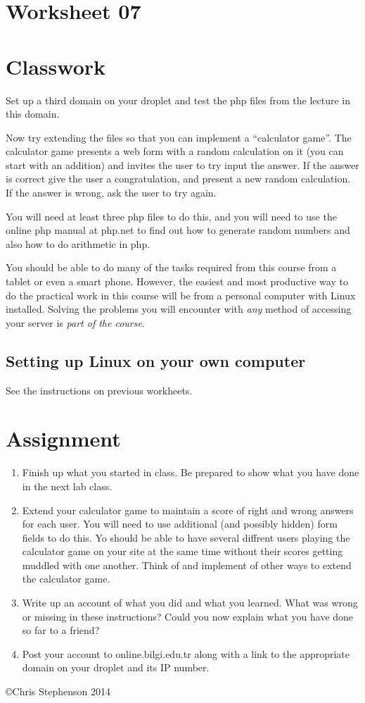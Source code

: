 \documentclass[12pt, a4paper]{article}
\begin{document}
\section*{Worksheet 07}


\section*{Classwork}
Set up a third domain on your droplet and test the php files from the lecture in this domain.

Now try extending the files so that you can implement a ``calculator game''. The calculator game presents a web form with a random calculation on it (you can start with an addition) and invites the user to try input the answer. If the answer is correct give the user a congratulation, and present a new random calculation. If the answer is wrong, ask the user to try again.

You will need at least three php files to do this, and you will need to use the online php manual at php.net to find out how to generate random numbers and also how to do arithmetic in php.

You should be able to do many of the tasks required from this course from a tablet or even a smart phone. However, the easiest and most productive way to do the practical work in this course will be from a personal computer with Linux installed. Solving the problems you will encounter with \emph{any} method of accessing your server is \emph{part of the course}.

\subsection*{Setting up Linux on your own computer}

See the instructions on previous workheets.


\section*{Assignment}

\begin{enumerate}
\item Finish up what you started in class. Be prepared to show what you have done in the next lab class. 
\item Extend your calculator game to maintain a score of right and wrong answers for each user. You will need to use additional (and possibly hidden) form fields to do this. Yo should be able to have several diffrent users playing the calculator game on your site at the same time without their scores getting muddled with one another. Think of and implement of other ways to extend the calculator game. 
\item Write up an account of what you did and what you learned. What was wrong or missing in these instructions? Could you now explain what you have done so far to a friend?
\item Post your account to online.bilgi.edu.tr along with a link to the appropriate domain on your droplet and its IP number.

\end{enumerate}

\copyright Chris Stephenson 2014
\end{document}
